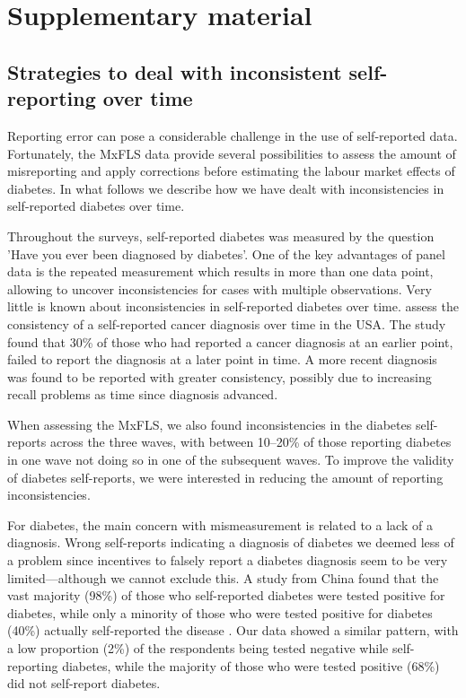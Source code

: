 \documentclass[12pt,english]{article}
\begin{document}
\printbibliography


\clearpage
\setcounter{table}{0}
\renewcommand{\thetable}{S\arabic{table}}
\setcounter{figure}{0}
\setcounter{page}{1}
\renewcommand{\thefigure}{S\arabic{figure}} %
\section*{Supplementary material}

\subsection*{\label{sec:Appendix}Strategies to deal with inconsistent self-reporting over time}

Reporting error can pose a considerable challenge in the use of self-reported data. Fortunately, the \ac{MxFLS} data provide several possibilities to assess the amount of misreporting and apply corrections before estimating the labour market effects of diabetes. In what follows we describe how we have dealt with inconsistencies in self-reported diabetes over time.

Throughout the surveys, self-reported diabetes was measured by the question 'Have you ever been diagnosed by diabetes'. One of the key advantages of panel data is the repeated measurement which results in more than one data point, allowing to uncover inconsistencies for cases with multiple observations. Very little is known about inconsistencies in self-reported diabetes over time. \textcite{Zajacova2010} assess the consistency of a self-reported cancer diagnosis over time in the USA. The study found that 30\% of those who had reported a cancer diagnosis at an earlier point, failed to report the diagnosis at a later point in time. A more recent diagnosis was found to be reported with greater consistency, possibly due to increasing recall problems as time since diagnosis advanced.

When assessing the \ac{MxFLS}, we also found inconsistencies in the diabetes self-reports across the three waves, with between 10--20\% of those reporting diabetes in one wave not doing so in one of the subsequent waves. To improve the validity of diabetes self-reports, we were interested in reducing the amount of reporting inconsistencies.

For diabetes, the main concern with mismeasurement is related to a lack of a diagnosis. Wrong self-reports indicating a diagnosis of diabetes we deemed less of a problem since incentives to falsely report a diabetes diagnosis seem to be very limited---although we cannot exclude this.  A study from China found that the vast majority (98\%) of those who self-reported diabetes were tested positive for diabetes, while only a minority  of those who were tested positive for diabetes (40\%) actually self-reported the disease \parencite{Yuan2015}.  Our data showed a similar pattern, with a low proportion (2\%) of the respondents being tested negative while self-reporting diabetes, while the majority of those who were tested positive (68\%) did not self-report diabetes.
\end{document}
